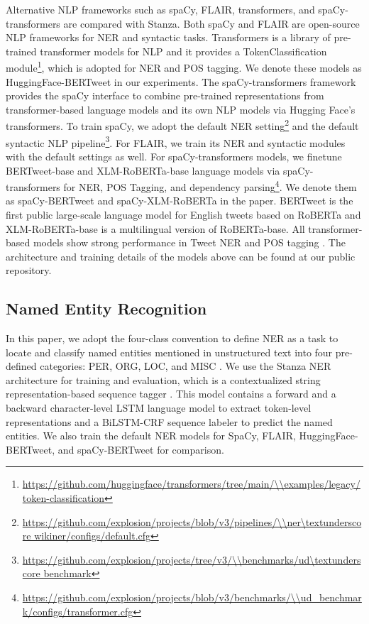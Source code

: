 \documentclass[10pt, a4paper]{article}
\begin{document}
Alternative NLP frameworks such as spaCy, FLAIR, transformers, and spaCy-transformers are compared with Stanza. Both spaCy and FLAIR are open-source NLP frameworks for NER and syntactic tasks. Transformers is a library of pre-trained transformer models for NLP and it provides a TokenClassification module\footnote{\url{https://github.com/huggingface/transformers/tree/main/\\examples/legacy/token-classification}}, which is adopted for NER and POS tagging. We denote these models as HuggingFace-BERTweet in our experiments. The spaCy-transformers framework provides the spaCy interface to combine pre-trained representations from transformer-based language models and its own NLP models via Hugging Face's transformers. To train spaCy, we adopt the default NER setting\footnote{\url{https://github.com/explosion/projects/blob/v3/pipelines/\\ner\textunderscore wikiner/configs/default.cfg}} and the default syntactic NLP pipeline\footnote{\url{https://github.com/explosion/projects/tree/v3/\\benchmarks/ud\textunderscore benchmark}}. For FLAIR, we train its NER and syntactic modules with the default settings as well. For spaCy-transformers models, we finetune BERTweet-base and XLM-RoBERTa-base language models via spaCy-transformers for NER, POS Tagging, and dependency parsing\footnote{\url{https://github.com/explosion/projects/blob/v3/benchmarks/\\ud\_benchmark/configs/transformer.cfg}}. We denote them as spaCy-BERTweet and spaCy-XLM-RoBERTa in the paper. BERTweet \cite{nguyen2020bertweet} is the first public large-scale language model for English tweets based on RoBERTa and XLM-RoBERTa-base is a multilingual version of RoBERTa-base. All transformer-based models show strong performance in Tweet NER and POS tagging \cite{nguyen2020bertweet}. The architecture and training details of the models above can be found at our public repository.



\subsection{Named Entity Recognition}
In this paper, we adopt the four-class convention to define NER as a task to locate and classify named entities mentioned in unstructured text into four pre-defined categories: PER, ORG, LOC, and MISC \cite{sang2003introduction}. We use the Stanza NER architecture for training and evaluation, which is a contextualized string representation-based sequence tagger \cite{akbik2018contextual}. This model contains a forward and a backward character-level LSTM language model to extract token-level representations and a BiLSTM-CRF sequence labeler to predict the named entities. We also train the default NER models for SpaCy, FLAIR, HuggingFace-BERTweet, and spaCy-BERTweet for comparison. 
\end{document}
